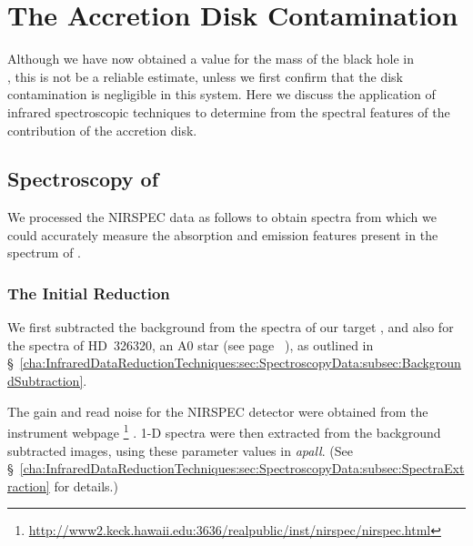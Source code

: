 
\chapter{The Accretion Disk Contamination}
\label{cha:AccretionDiskContamination}

Although we have now obtained a value for the mass of the black hole in \\%
\groj, this is not  be a reliable estimate, unless we first confirm that the disk contamination is negligible in this system. Here we discuss the application of infrared spectroscopic techniques to determine from the spectral features of \groj the contribution of the accretion disk. %


\section{Spectroscopy of \groj}
\label{cha:AccretionDiskContamination:sec:Spectroscopy}

We processed the NIRSPEC data as follows to obtain spectra from which we could accurately measure the absorption and emission features present in the spectrum of \groj.


\subsection{The Initial Reduction}
\label{cha:AccretionDiskContamination:sec:Spectroscopy:subsec:InitialReduction}

We first subtracted the background from the spectra of our target \groj, and also for the spectra
of \mbox{HD 326320}, an A0 star (see page~%
\pageref{cha:GROJ1655-40:sec:ObservationsOfJ1655:subsec:DetailsOfTheObservations:subsubsec:2000Spectroscopy}%
), as outlined in \S~\ref{cha:InfraredDataReductionTechniques:sec:SpectroscopyData:subsec:BackgroundSubtraction}. %

\vspace{\myparskip}

The gain and read noise for the NIRSPEC detector were
obtained from the instrument webpage%
\footnote{%
\label{cha:AccretionDiskContamination:sec:Spectroscopy:subsec:InitialReduction:foot:Nirspec}
\url{http://www2.keck.hawaii.edu:3636/realpublic/inst/nirspec/nirspec.html} }%
. 1-D spectra were then extracted from the background subtracted images, using
these parameter values in \textit{apall}. (See \S~\ref{cha:InfraredDataReductionTechniques:sec:SpectroscopyData:subsec:SpectraExtraction} for details.) %

